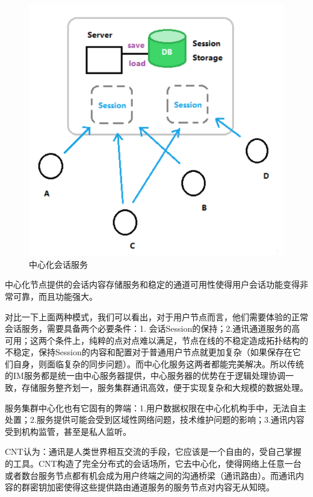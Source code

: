 \documentclass[a4paper,12pt]{article}
\begin{document}
\begin {figure} [htbp]
\centering \includegraphics [width = 5in] {pic_cn/c2.png}
\caption {中心化会话服务} \label {fig: c2}
\end {figure}

中心化节点提供的会话内容存储服务和稳定的通道可用性使得用户会话功能变得非常可靠，而且功能强大。

对比一下上面两种模式，我们可以看出，对于用户节点而言，他们需要体验的正常会话服务，需要具备两个必要条件：1. 会话Session的保持；2.通讯通道服务的高可用；这两个条件上，纯粹的点对点难以满足，节点在线的不稳定造成拓扑结构的不稳定，保持Session的内容和配置对于普通用户节点就更加复杂（如果保存在它们自身，则面临复杂的同步问题）。而中心化服务这两者都能完美解决。所以传统的IM服务都是统一由中心服务器提供，中心服务器的优势在于逻辑处理协调一致，存储服务整齐划一，服务集群通讯高效，便于实现复杂和大规模的数据处理。

服务集群中心化也有它固有的弊端：1.用户数据权限在中心化机构手中，无法自主处置；2.服务提供可能会受到区域性网络问题，技术维护问题的影响；3.通讯内容受到机构监管，甚至是私人监听。

CNT认为：通讯是人类世界相互交流的手段，它应该是一个自由的，受自己掌握的工具。CNT构造了完全分布式的会话场所，它去中心化，使得网络上任意一台或者数台服务节点都有机会成为用户终端之间的沟通桥梁（通讯路由）。而通讯内容的群密钥加密使得这些提供路由通道服务的服务节点对内容无从知晓。
\end{document}
